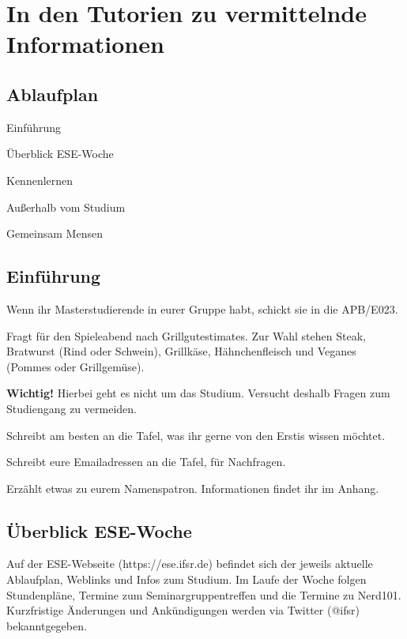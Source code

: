 \documentclass[a4paper,12pt]{report}
\begin{document}
\chapter{In den Tutorien zu vermittelnde Informationen}

\section{Ablaufplan}
\begin{itemize*}
	\item Einführung
	\item Überblick ESE-Woche
	\item Kennenlernen
	\item Außerhalb vom Studium
	\item Gemeinsam Mensen
\end{itemize*}

\section{Einführung}
\begin{itemize*}
	\item Wenn ihr Masterstudierende in eurer Gruppe habt, schickt sie in die APB/E023.
	\item Fragt für den Spieleabend nach Grillgutestimates. Zur Wahl stehen Steak, Bratwurst (Rind oder Schwein), Grillkäse, Hähnchenfleisch und Veganes (Pommes oder Grillgemüse). 
	\item \textbf{Wichtig!} Hierbei geht es nicht um das Studium. Versucht deshalb Fragen zum Studiengang zu vermeiden.
	\item Schreibt am besten an die Tafel, was ihr gerne von den Erstis wissen möchtet.
	\item Schreibt eure Emailadressen an die Tafel, für Nachfragen.
	\item Erzählt etwas zu eurem Namenspatron. Informationen findet ihr im Anhang.
\end{itemize*}

\section{Überblick ESE-Woche}

\begin{framed}
Auf der ESE-Webseite (https://ese.ifsr.de) befindet sich der jeweils aktuelle Ablaufplan, Weblinks und Infos zum Studium. Im Laufe der Woche folgen Stundenpläne, Termine zum Seminargruppentreffen und die Termine zu Nerd101. Kurzfristige Änderungen und Ankündigungen werden via Twitter (@ifsr) bekanntgegeben.
\end{framed}
\end{document}
